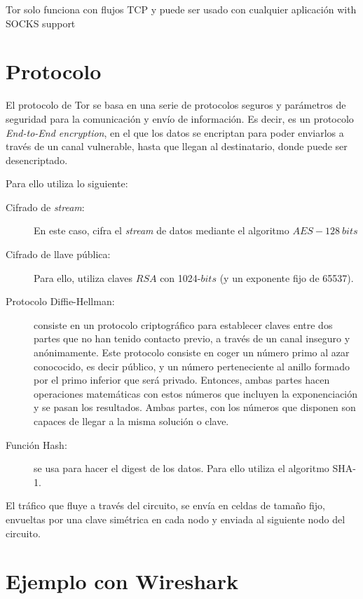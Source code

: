 \documentclass[10pt,a4paper,spanish]{article}
\begin{document}
Tor solo funciona con flujos TCP y puede ser usado con cualquier aplicación with SOCKS support %

\section{Protocolo}

El protocolo de Tor se basa en una serie de protocolos seguros y parámetros de seguridad para la comunicación y envío de información. Es decir, es un protocolo \textit{End-to-End encryption}, en el que los datos se encriptan para poder enviarlos a través de un canal vulnerable, hasta que llegan al destinatario, donde puede ser desencriptado.

Para ello utiliza lo siguiente:

\begin{description}
    \item [Cifrado de \textit{stream}:] En este caso, cifra el \textit{stream} de datos mediante el algoritmo $AES-128~bits$
    \item [Cifrado de llave pública:] Para ello, utiliza claves $RSA$ con 1024-$bits$ (y un exponente fijo de 65537).
    \item [Protocolo Diffie-Hellman:] consiste en un protocolo criptográfico para establecer claves entre dos partes que no han tenido contacto previo, a través de un canal inseguro y anónimamente. Este protocolo consiste en coger un número primo al azar conococido, es decir público, y un número perteneciente al anillo formado por el primo inferior que será privado. Entonces, ambas partes hacen operaciones matemáticas con estos números que incluyen la exponenciación y se pasan los resultados. Ambas partes, con los números que disponen son capaces de llegar a la misma solución o clave.
    \item [Función Hash:] se usa para hacer el digest de los datos. Para ello utiliza el algoritmo SHA-1.
\end{description}

El tráfico que fluye a través del circuito, se envía en celdas de tamaño fijo, envueltas por una clave simétrica en cada nodo y enviada al siguiente nodo del circuito. 

\section{Ejemplo con Wireshark}

\end{document}
